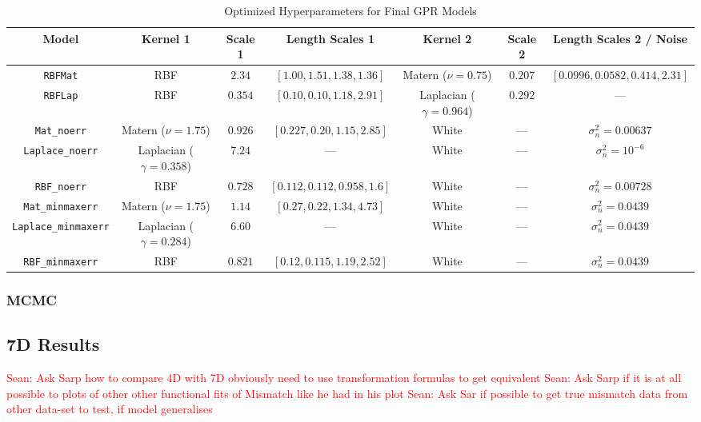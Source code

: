 \documentclass[11pt]{article}
\newcommand{\Sean}[1]{{\textcolor{red}{{Sean: #1}} }}
\begin{document}
\begin{table}[H]
\centering
\caption{Optimized Hyperparameters for Final GPR Models}
\footnotesize  %
\renewcommand{\arraystretch}{1.15}  %
\setlength{\tabcolsep}{4pt}  %
\label{tab:final_gpr_hyperparams}
{\fontsize{7}{9.5}\selectfont
\begin{tabular}{|c|c|c|c|c|c|c|}
\hline
\textbf{Model} & \textbf{Kernel 1} & \textbf{Scale 1} & \textbf{Length Scales 1} & \textbf{Kernel 2} & \textbf{Scale 2} & \textbf{Length Scales 2 / Noise} \\
\hline
\texttt{RBFMat} & RBF & $2.34$ & $[1.00, 1.51, 1.38, 1.36]$ & Matern ($\nu = 0.75$) & $0.207$ & $[0.0996, 0.0582, 0.414, 2.31]$ \\
\texttt{RBFLap} & RBF & $0.354$ & $[0.10, 0.10, 1.18, 2.91]$ & Laplacian ($\gamma = 0.964$) & $0.292$ & --- \\
\texttt{Mat\_noerr} & Matern ($\nu = 1.75$) & $0.926$ & $[0.227, 0.20, 1.15, 2.85]$ & White & --- & $\sigma_n^2 = 0.00637$ \\
\texttt{Laplace\_noerr} & Laplacian ($\gamma = 0.358$) & $7.24$ & --- & White & --- & $\sigma_n^2 = 10^{-6}$ \\
\texttt{RBF\_noerr} & RBF & $0.728$ & $[0.112, 0.112, 0.958, 1.6]$ & White & --- & $\sigma_n^2 = 0.00728$ \\
\texttt{Mat\_minmaxerr} & Matern ($\nu = 1.75$) & $1.14$ & $[0.27, 0.22, 1.34, 4.73]$ & White & --- & $\sigma_n^2 = 0.0439$ \\
\texttt{Laplace\_minmaxerr} & Laplacian ($\gamma = 0.284$) & $6.60$ & --- & White & --- & $\sigma_n^2 = 0.0439$ \\
\texttt{RBF\_minmaxerr} & RBF & $0.821$ & $[0.12, 0.115, 1.19, 2.52]$ & White & --- & $\sigma_n^2 = 0.0439$ \\
\hline
\end{tabular}}
\end{table}


\subsubsection*{MCMC}

\subsection{7D Results}
\Sean{Ask Sarp how to compare 4D with 7D obviously need to use transformation formulas to get equivalent}
\Sean{Ask Sarp if it is at all possible to plots of other other functional fits of Mismatch like he had in his plot}
\Sean{Ask Sar if possible to get true mismatch data from other data-set to test, if model generalises}
\end{document}
